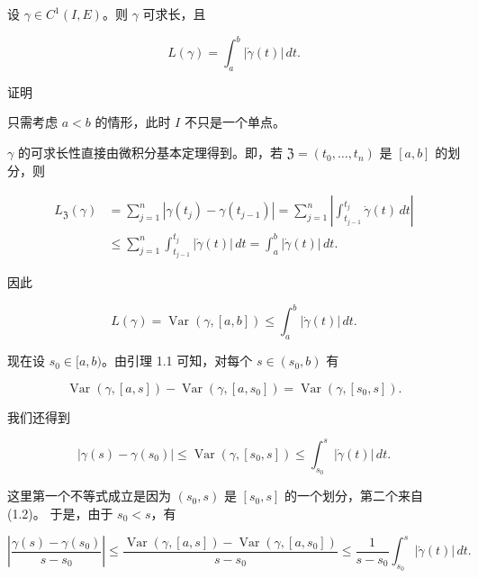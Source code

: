 \begin{theorem}

设 $ \gamma \in C^{1}(I,E) $。则 $ \gamma $ 可求长，且

\[
L(\gamma) = \int_a^b |\dot{\gamma}(t)|\,dt .
\]

证明

\begin{subitems}
\item

只需考虑 $ a < b $ 的情形，此时 $ I $ 不只是一个单点。

\item

$ \gamma $ 的可求长性直接由微积分基本定理得到。即，若 $ \mathfrak{Z} = (t_0,\ldots,t_n) $ 是 $ [a,b] $ 的划分，则

\begin{equation*}
\begin{aligned}
L_{\mathfrak{Z}}(\gamma) &= \sum_{j=1}^{n}|\gamma(t_j) - \gamma(t_{j-1})| = \sum_{j=1}^{n}\left|\int_{t_{j-1}}^{t_j}\dot{\gamma}(t)\,dt\right| \\ &\le \sum_{j=1}^{n}\int_{t_{j-1}}^{t_j}|\dot{\gamma}(t)|\,dt = \int_a^b |\dot{\gamma}(t)|\,dt .
\end{aligned}
\end{equation*}

因此

\begin{equation}
L(\gamma) = \operatorname{Var}(\gamma,[a,b]) \le \int_a^b |\dot{\gamma}(t)|\,dt .\tag{1.2}
\end{equation}
\item

现在设 $ s_0 \in [a,b) $。由引理 1.1 可知，对每个 $ s \in (s_0,b) $ 有

\[
\operatorname{Var}(\gamma,[a,s]) - \operatorname{Var}(\gamma,[a,s_0]) = \operatorname{Var}(\gamma,[s_0,s]) .
\]

我们还得到

\[
|\gamma(s) - \gamma(s_0)| \le \operatorname{Var}(\gamma,[s_0,s]) \le \int_{s_0}^{s}|\dot{\gamma}(t)|\,dt .
\]

这里第一个不等式成立是因为 $ (s_0,s) $ 是 $ [s_0,s] $ 的一个划分，第二个来自 (1.2)。
于是，由于 $ s_0 < s $，有

\begin{equation}
\left|\frac{\gamma(s) - \gamma(s_0)}{s - s_0}\right| \le \frac{\operatorname{Var}(\gamma,[a,s]) - \operatorname{Var}(\gamma,[a,s_0])}{s - s_0} \le \frac{1}{s - s_0}\int_{s_0}^{s}|\dot{\gamma}(t)|\,dt .\tag{1.3}
\end{equation}


\end{subitems}
\end{theorem}
